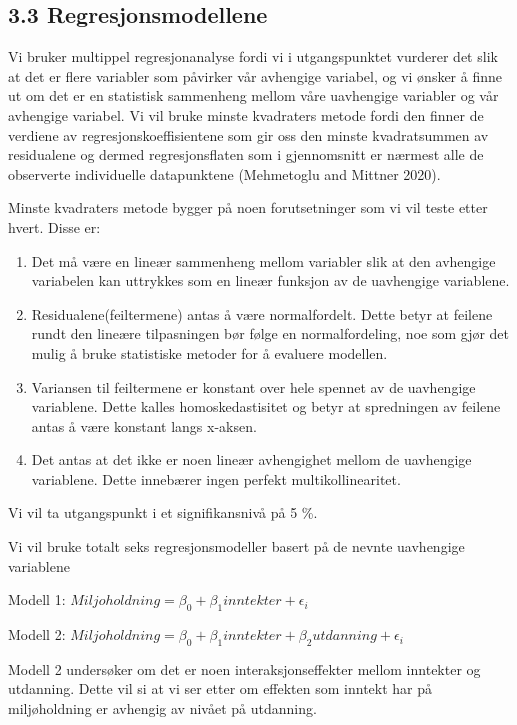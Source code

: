 \documentclass[
  12pt,
  letterpaper,
  DIV=11,
  numbers=noendperiod]{scrartcl}
\begin{document}
\hypertarget{regresjonsmodellene}{%
\subsection{3.3 Regresjonsmodellene}\label{regresjonsmodellene}}

Vi bruker multippel regresjonanalyse fordi vi i utgangspunktet vurderer
det slik at det er flere variabler som påvirker vår avhengige variabel,
og vi ønsker å finne ut om det er en statistisk sammenheng mellom våre
uavhengige variabler og vår avhengige variabel. Vi vil bruke minste
kvadraters metode fordi den finner de verdiene av
regresjonskoeffisientene som gir oss den minste kvadratsummen av
residualene og dermed regresjonsflaten som i gjennomsnitt er nærmest
alle de observerte individuelle datapunktene (Mehmetoglu and Mittner
2020).

Minste kvadraters metode bygger på noen forutsetninger som vi vil teste
etter hvert. Disse er:

\begin{enumerate}
\def\labelenumi{\arabic{enumi}.}
\item
  Det må være en lineær sammenheng mellom variabler slik at den
  avhengige variabelen kan uttrykkes som en lineær funksjon av de
  uavhengige variablene.
\item
  Residualene(feiltermene) antas å være normalfordelt. Dette betyr at
  feilene rundt den lineære tilpasningen bør følge en normalfordeling,
  noe som gjør det mulig å bruke statistiske metoder for å evaluere
  modellen.
\item
  Variansen til feiltermene er konstant over hele spennet av de
  uavhengige variablene. Dette kalles homoskedastisitet og betyr at
  spredningen av feilene antas å være konstant langs x-aksen.
\item
  Det antas at det ikke er noen lineær avhengighet mellom de uavhengige
  variablene. Dette innebærer ingen perfekt multikollinearitet.
\end{enumerate}

Vi vil ta utgangspunkt i et signifikansnivå på 5 \%.

Vi vil bruke totalt seks regresjonsmodeller basert på de nevnte
uavhengige variablene

Modell 1: \(Miljoholdning=\beta_0 + \beta_1inntekter + \epsilon_i\ \)

Modell 2:
\(Miljoholdning=\beta_0 + \beta_1inntekter + \beta_2utdanning + \epsilon_i\ \)

Modell 2 undersøker om det er noen interaksjonseffekter mellom inntekter
og utdanning. Dette vil si at vi ser etter om effekten som inntekt har
på miljøholdning er avhengig av nivået på utdanning.
\end{document}
